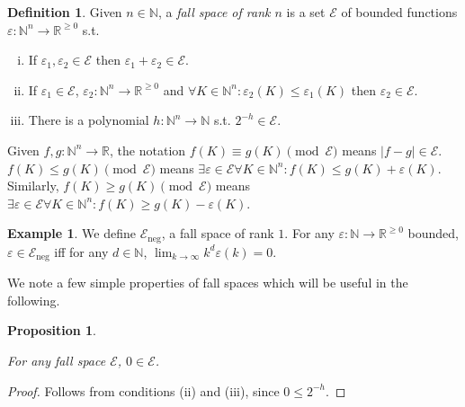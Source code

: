 \documentclass{article}
\numberwithin{equation}{section}
\theoremstyle{definition}
\newtheorem{definition}{Definition}[section]
\newtheorem{example}{Example}[section]
\theoremstyle{plain}
\newtheorem{proposition}{Proposition}[section]
\newcommand{\Nats}{\mathbb{N}}
\newcommand{\Reals}{\mathbb{R}}
\newcommand{\Lim}[1]{\lim_{#1 \rightarrow \infty}}
\newcommand{\Abs}[1]{\lvert #1 \rvert}
\newcommand{\Fall}{\mathcal{E}}
\begin{document}
\begin{definition}

Given $n \in \Nats$, a \emph{fall space of rank $n$} is a set $\Fall$ of bounded functions $\varepsilon: \Nats^n \rightarrow \Reals^{\geq 0}$ s.t.

\begin{enumerate}[(i)]

\item If $\varepsilon_1, \varepsilon_2 \in \Fall$ then $\varepsilon_1 + \varepsilon_2 \in \Fall$.

\item If $\varepsilon_1 \in \Fall$, $\varepsilon_2: \Nats^n \rightarrow \Reals^{\geq 0}$ and $\forall K \in \Nats^n: \varepsilon_2(K) \leq \varepsilon_1(K)$ then $\varepsilon_2 \in \Fall$.

\item There is a polynomial $h: \Nats^n \rightarrow \Nats$ s.t. $2^{-h} \in \Fall$.

\end{enumerate}

Given $f,g: \Nats^n \rightarrow \Reals$, the notation $f(K) \equiv g(K) \pmod \Fall$ means $\Abs{f-g} \in \Fall$. $f(K) \leq g(K) \pmod \Fall$ means $\exists \varepsilon \in \Fall \forall K \in \Nats^n: f(K) \leq g(K) + \varepsilon(K)$. Similarly, $f(K) \geq g(K) \pmod \Fall$ means $\exists \varepsilon \in \Fall \forall K \in \Nats^n: f(K) \geq g(K) - \varepsilon(K)$.

\end{definition}

\begin{example}

We define $\Fall_{\text{neg}}$, a fall space of rank $1$. For any $\varepsilon: \Nats \rightarrow \Reals^{\geq 0}$ bounded, $\varepsilon \in \Fall_{\text{neg}}$ iff for any $d \in \Nats$, $\Lim{k} k^d \varepsilon(k) = 0$.

\end{example}

We note a few simple properties of fall spaces which will be useful in the following.

\begin{proposition}
\label{prp:err_spc_zero}

For any fall space $\Fall$, $0 \in \Fall$.

\end{proposition}

\begin{proof}

Follows from conditions (ii) and (iii), since $0 \leq 2^{-h}$.
\end{proof}
\end{document}
